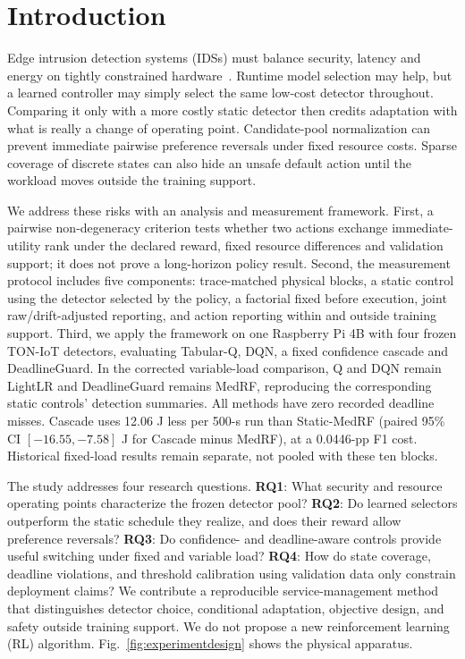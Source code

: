 \section{Introduction}
Edge intrusion detection systems (IDSs) must balance security, latency and energy on tightly constrained hardware~\cite{Zhang2024VehicleEdge,Murti2024vRAN,Zhang2024DVFO}. Runtime model selection may help, but a learned controller may simply select the same low-cost detector throughout. Comparing it only with a more costly static detector then credits adaptation with what is really a change of operating point. Candidate-pool normalization can prevent immediate pairwise preference reversals under fixed resource costs. Sparse coverage of discrete states can also hide an unsafe default action until the workload moves outside the training support. 

We address these risks with an analysis and measurement framework. First, a pairwise non-degeneracy criterion tests whether two actions exchange immediate-utility rank under the declared reward, fixed resource differences and validation support; it does not prove a long-horizon policy result. Second, the measurement protocol includes five components: trace-matched physical blocks, a static control using the detector selected by the policy, a factorial fixed before execution, joint raw/drift-adjusted reporting, and action reporting within and outside training support. Third, we apply the framework on one Raspberry Pi 4B with four frozen TON-IoT detectors, evaluating Tabular-Q, DQN, a fixed confidence cascade and DeadlineGuard. In the corrected variable-load comparison, Q and DQN remain LightLR and DeadlineGuard remains MedRF, reproducing the corresponding static controls' detection summaries. All methods have zero recorded deadline misses. Cascade uses 12.06 J less per 500-s run than Static-MedRF (paired 95\% CI $[-16.55,-7.58]$ J for Cascade minus MedRF), at a 0.0446-pp F1 cost. Historical fixed-load results remain separate, not pooled with these ten blocks.

The study addresses four research questions. \textbf{RQ1}: What security and resource operating points characterize the frozen detector pool? \textbf{RQ2}: Do learned selectors outperform the static schedule they realize, and does their reward allow preference reversals? \textbf{RQ3}: Do confidence- and deadline-aware controls provide useful switching under fixed and variable load? \textbf{RQ4}: How do state coverage, deadline violations, and threshold calibration using validation data only constrain deployment claims? We contribute a reproducible service-management method that distinguishes detector choice, conditional adaptation, objective design, and safety outside training support. We do not propose a new reinforcement learning (RL) algorithm. Fig.~\ref{fig:experimentdesign} shows the physical apparatus.

